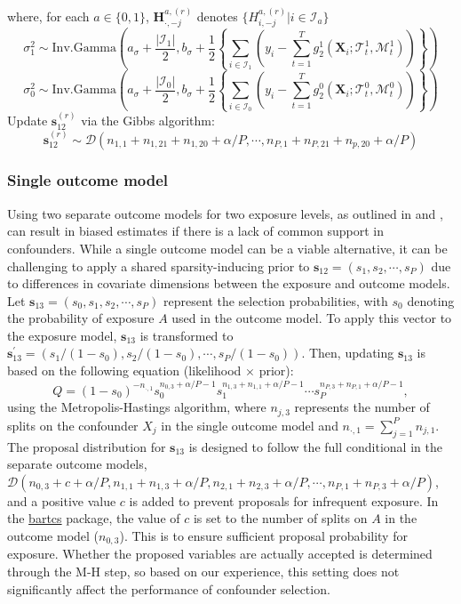 \begin{algorithm}
\begin{algorithmic}[1]
where, for each $a\in\{0,1\}$, $\boldsymbol{H}_{\cdot, -j}^{a, (r)}$ denotes $\{H_{i, -j}^{a, (r)} | i \in \mathcal{I}_a\}$
\EndFor
\State \[\sigma^2_{1} \sim \text{Inv.Gamma}\left(a_\sigma+\frac{|\mathcal{I}_1|}{2}, b_\sigma+\frac{1}{2}\left\{\sum_{i \in \mathcal{I}_1} \left(y_i - \sum_{t=1}^T g_2^1(\boldsymbol{X}_i; \mathcal{T}_t^1, \mathcal{M}_t^1)\right) \right\}\right)\]
\[\sigma^2_{0} \sim \text{Inv.Gamma}\left(a_\sigma+\frac{|\mathcal{I}_0|}{2}, b_\sigma+\frac{1}{2}\left\{\sum_{i \in \mathcal{I}_0} \left(y_i - \sum_{t=1}^T g_2^0(\boldsymbol{X}_i; \mathcal{T}_t^0, \mathcal{M}_t^0)\right) \right\}\right)\]
\State Update $\boldsymbol{s}_{12}^{(r)}$ via the Gibbs algorithm:
 \[\boldsymbol{s}_{12}^{(r)} \sim \mathcal{D}\left(n_{1,1}+n_{1,21}+n_{1,20} + \alpha/P, \cdots, n_{P,1}+n_{P,21}+n_{p,20} + \alpha/P\right)\]
\EndFor
\end{algorithmic}
\end{algorithm}

\subsubsection{Single outcome model}
Using two separate outcome models for two exposure levels, as outlined in \cite{bartcause} and \cite{hahn2020bayesian}, can result in biased estimates if there is a lack of common support in confounders. While a single outcome model can be a viable alternative, it can be challenging to apply a shared sparsity-inducing prior to $\boldsymbol{s}_{12} = (s_1, s_2, \cdots, s_P)$ due to differences in covariate dimensions between the exposure and outcome models. Let $\boldsymbol{s}_{13} =(s_0, s_1, s_2, \cdots, s_P)$ represent the selection probabilities, with $s_0$ denoting the probability of exposure $A$ used in the outcome model. To apply this vector to the exposure model, $\boldsymbol{s}_{13}$ is transformed to $\boldsymbol{s}_{13}^\prime = (s_1/(1-s_0), s_2/(1-s_0), \cdots, s_P/(1-s_0))$. Then, updating $\boldsymbol{s}_{13}$ is based on the following equation (likelihood $\times$ prior):
 \[Q = \left(1-s_0\right)^{-n_{\cdot,1}} s_0^{n_{0,3}+\alpha/P-1} s_1^{n_{1,3}+n_{1,1}+\alpha/P-1} \cdots s_P^{n_{P,3}+n_{P,1}+\alpha/P-1},\] using the Metropolis-Hastings algorithm, where $n_{j,3}$ represents the number of splits on the confounder $X_j$ in the single outcome model and $n_{\cdot, 1} = \sum_{j=1}^P n_{j,1}$. The proposal distribution for $\boldsymbol{s}_{13}$ is designed to follow the full conditional in the separate outcome models, $\mathcal{D}(n_{0,3}+c+\alpha/P, n_{1,1}+n_{1,3}+\alpha/P, n_{2,1}+n_{2,3}+\alpha/P, \cdots, n_{P,1}+n_{P,3}+\alpha/P)$, and a positive value $c$ is added to prevent proposals for infrequent exposure. In the \href{https://cran.r-project.org/package=bartcs}{bartcs} package, the value of $c$ is set to the number of splits on $A$ in the outcome model ($n_{0,3}$). This is to ensure sufficient proposal probability for exposure. Whether the proposed variables are actually accepted is determined through the M-H step, so based on our experience, this setting does not significantly affect the performance of confounder selection.
 
